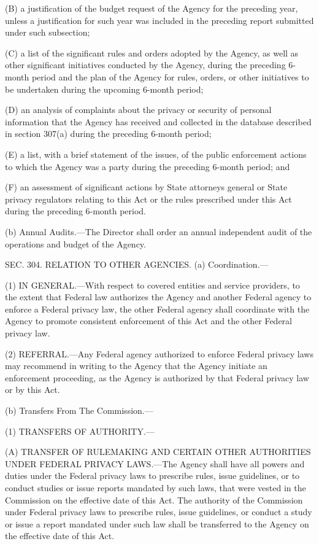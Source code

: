 (B) a justification of the budget request of the Agency for the preceding year, unless a justification for such year was included in the preceding report submitted under such subsection;

(C) a list of the significant rules and orders adopted by the Agency, as well as other significant initiatives conducted by the Agency, during the preceding 6-month period and the plan of the Agency for rules, orders, or other initiatives to be undertaken during the upcoming 6-month period;

(D) an analysis of complaints about the privacy or security of personal information that the Agency has received and collected in the database described in section 307(a) during the preceding 6-month period;

(E) a list, with a brief statement of the issues, of the public enforcement actions to which the Agency was a party during the preceding 6-month period; and

(F) an assessment of significant actions by State attorneys general or State privacy regulators relating to this Act or the rules prescribed under this Act during the preceding 6-month period.

(b) Annual Audits.—The Director shall order an annual independent audit of the operations and budget of the Agency.


SEC. 304. RELATION TO OTHER AGENCIES.
(a) Coordination.—

(1) IN GENERAL.—With respect to covered entities and service providers, to the extent that Federal law authorizes the Agency and another Federal agency to enforce a Federal privacy law, the other Federal agency shall coordinate with the Agency to promote consistent enforcement of this Act and the other Federal privacy law.

(2) REFERRAL.—Any Federal agency authorized to enforce Federal privacy laws may recommend in writing to the Agency that the Agency initiate an enforcement proceeding, as the Agency is authorized by that Federal privacy law or by this Act.

(b) Transfers From The Commission.—

(1) TRANSFERS OF AUTHORITY.—

(A) TRANSFER OF RULEMAKING AND CERTAIN OTHER AUTHORITIES UNDER FEDERAL PRIVACY LAWS.—The Agency shall have all powers and duties under the Federal privacy laws to prescribe rules, issue guidelines, or to conduct studies or issue reports mandated by such laws, that were vested in the Commission on the effective date of this Act. The authority of the Commission under Federal privacy laws to prescribe rules, issue guidelines, or conduct a study or issue a report mandated under such law shall be transferred to the Agency on the effective date of this Act.

